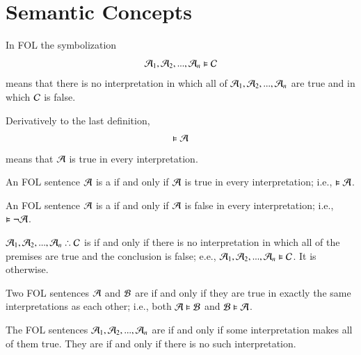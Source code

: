 \documentclass[12pt, a4paper, oneside, openright, titlepage]{book}
\begin{document}
\section{\textsection Semantic Concepts}

\begin{defn}
    In FOL the symbolization \begin{equation*}
        \mathcal{A}_1,\mathcal{A}_2,...,\mathcal{A}_n\vDash \mathcal{C}
    \end{equation*}
    means that there is no interpretation in which all of $\mathcal{A}_1,\mathcal{A}_2,...,\mathcal{A}_n$ are true and in which $\mathcal{C}$ is false.
\end{defn}


\begin{defn}
    Derivatively to the last definition, \begin{equation*}
        \vDash \mathcal{A}
    \end{equation*}
    means that $\mathcal{A}$ is true in every interpretation. 
\end{defn}

\begin{defn}
    An FOL sentence $\mathcal{A}$ is a  if and only if $\mathcal{A}$ is true in every interpretation; i.e., $\vDash \mathcal{A}$.
\end{defn}

\begin{defn}
    An FOL sentence $\mathcal{A}$ is a  if and only if $\mathcal{A}$ is false in every interpretation; i.e., $\vDash \neg\mathcal{A}$.
\end{defn}

\begin{defn}
    $\metav{A}_1,\metav{A}_2,...,\metav{A}_n\therefore \metav{C}$ is  if and only if there is no interpretation in which all of the premises are true and the conclusion is false; e.e., $\mathcal{A}_1,\mathcal{A}_2,...,\mathcal{A}_n\vDash\mathcal{C}$. It is  otherwise.
\end{defn}


\begin{defn}
    Two FOL sentences $\mathcal{A}$ and $\mathcal{B}$ are  if and only if they are true in exactly the same interpretations as each other; i.e., both $\mathcal{A}\vDash \mathcal{B}$ and $\mathcal{B}\vDash \mathcal{A}$.
\end{defn}

\begin{defn}
    The FOL sentences $\mathcal{A}_1,\mathcal{A}_2,...,\mathcal{A}_n$ are  if and only if some interpretation makes all of them true. They are  if and only if there is no such interpretation.
\end{defn}
\end{document}
